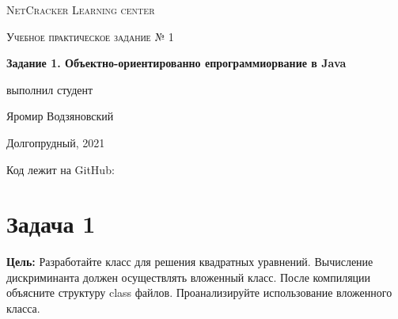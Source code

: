 \documentclass[a4paper]{article}
\begin{document}
\graphicspath{ {pictures/} }

\begin{titlepage}
	\centering
	\vspace{5cm}
    {\scshape\LARGE NetCracker Learning center\par}
	\vspace{5cm}
	{\scshape\Large  Учебное практическое задание № 1 \par}
	\vspace{1cm}
    {\huge\bfseries  Задание 1. Объектно-ориентированно епрограммиорвание в Java \par}
	\vspace{1cm}
	\vfill
    \begin{flushright}
        {\large выполнил студент}\par
        \vspace{0.3cm}
        {\LARGE Яромир Водзяновский}
    \end{flushright}
	\vfill
Долгопрудный, 2021
\end{titlepage}

\pagestyle{fancy} 
\fancyfoot[C]{ \noindent\rule{\textwidth}{0.4pt} \thepage }



\newpage


Код лежит на GitHub: 
\section{Задача 1}

\textbf{Цель:} Разработайте класс для решения квадратных уравнений. Вычисление дискриминанта должен осуществлять вложенный класс. После компиляции объясните структуру class файлов. Проанализируйте использование вложенного класса. \par
\end{document}
